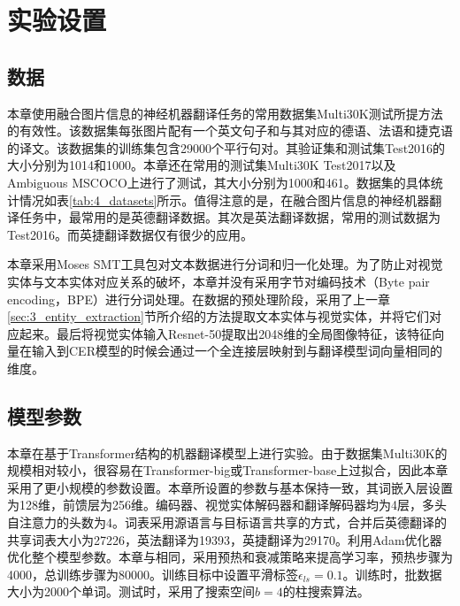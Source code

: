 \section{实验设置}
\label{sec:4_setup}

\subsection{数据}
\label{sec:4_dataset}


本章使用融合图片信息的神经机器翻译任务的常用数据集Multi30K测试所提方法的有效性。该数据集每张图片配有一个英文句子和与其对应的德语、法语和捷克语的译文。该数据集的训练集包含29000个平行句对。其验证集和测试集Test2016的大小分别为1014和1000。本章还在常用的测试集Multi30K Test2017以及Ambiguous MSCOCO上进行了测试，其大小分别为1000和461。数据集的具体统计情况如表\ref{tab:4_datasets}所示。值得注意的是，在融合图片信息的神经机器翻译任务中，最常用的是英德翻译数据。其次是英法翻译数据，常用的测试数据为Test2016。而英捷翻译数据仅有很少的应用。

本章采用Moses SMT工具包对文本数据进行分词和归一化处理。为了防止对视觉实体与文本实体对应关系的破坏，本章并没有采用字节对编码技术（Byte pair encoding，BPE）进行分词处理。在数据的预处理阶段，采用了上一章\ref{sec:3_entity_extraction}节所介绍的方法提取文本实体与视觉实体，并将它们对应起来。最后将视觉实体输入Resnet-50提取出2048维的全局图像特征，该特征向量在输入到CER模型的时候会通过一个全连接层映射到与翻译模型词向量相同的维度。

\subsection{模型参数}
\label{sec:4_model_setup}

本章在基于Transformer结构的机器翻译模型上进行实验。由于数据集Multi30K的规模相对较小，很容易在Transformer-big或Transformer-base上过拟合，因此本章采用了更小规模的参数设置。本章所设置的参数与基本保持一致，其词嵌入层设置为128维，前馈层为256维。编码器、视觉实体解码器和翻译解码器均为4层，多头自注意力的头数为4。词表采用源语言与目标语言共享的方式，合并后英德翻译的共享词表大小为27226，英法翻译为19393，英捷翻译为29170。利用Adam优化器优化整个模型参数。本章与相同，采用预热和衰减策略来提高学习率，预热步骤为4000，总训练步骤为80000。训练目标中设置平滑标签$\epsilon_{ls}=0.1$。训练时，批数据大小为2000个单词。测试时，采用了搜索空间$b=4$的柱搜索算法。

